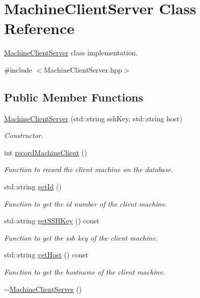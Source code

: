 \hypertarget{classMachineClientServer}{
\section{MachineClientServer Class Reference}
\label{classMachineClientServer}
}


\hyperlink{classMachineClientServer}{MachineClientServer} class implementation.  




{\ttfamily \#include $<$MachineClientServer.hpp$>$}

\subsection*{Public Member Functions}
\begin{DoxyCompactItemize}
\item 
\hyperlink{classMachineClientServer_a87d108a996a785273525e941a1865041}{MachineClientServer} (std::string sshKey, std::string host)
\begin{DoxyCompactList}\small\item\em Constructor. \item\end{DoxyCompactList}\item 
int \hyperlink{classMachineClientServer_af55d6bdfcade48ab4a32c4734157a690}{recordMachineClient} ()
\begin{DoxyCompactList}\small\item\em Function to record the client machine on the database. \item\end{DoxyCompactList}\item 
std::string \hyperlink{classMachineClientServer_a5e6fd30cd39767c320d85fa429b78dc5}{getId} ()
\begin{DoxyCompactList}\small\item\em Function to get the id number of the client machine. \item\end{DoxyCompactList}\item 
std::string \hyperlink{classMachineClientServer_a9522688e79c164be6b40d09ab4ff8ddf}{getSSHKey} () const 
\begin{DoxyCompactList}\small\item\em Function to get the ssh key of the client machine. \item\end{DoxyCompactList}\item 
std::string \hyperlink{classMachineClientServer_a869f92107107e7d56672b2376ec6bd26}{getHost} () const 
\begin{DoxyCompactList}\small\item\em Function to get the hostname of the client machine. \item\end{DoxyCompactList}\item 
\hypertarget{classMachineClientServer_a1e954577913db9ee09397b2d8f0d48a2}{
\hyperlink{classMachineClientServer_a1e954577913db9ee09397b2d8f0d48a2}{$\sim$MachineClientServer} ()}
\label{classMachineClientServer_a1e954577913db9ee09397b2d8f0d48a2}


\end{DoxyCompactItemize}
